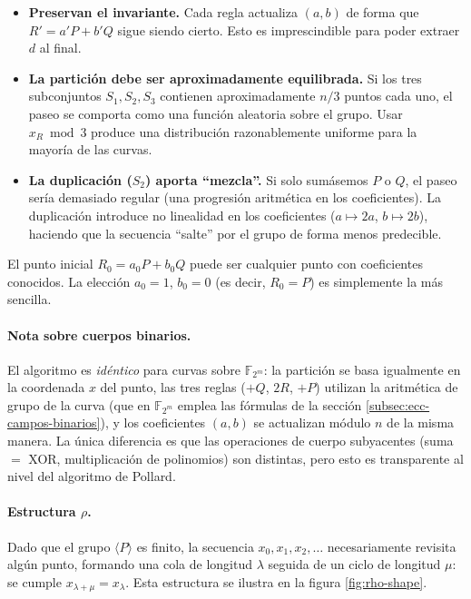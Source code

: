 \begin{itemize}
    \item \textbf{Preservan el invariante.} Cada regla actualiza $(a, b)$ de forma que $R' = a'P + b'Q$ sigue siendo cierto. Esto es imprescindible para poder extraer $d$ al final.

    \item \textbf{La partición debe ser aproximadamente equilibrada.} Si los tres subconjuntos $S_1, S_2, S_3$ contienen aproximadamente $n/3$ puntos cada uno, el paseo se comporta como una función aleatoria sobre el grupo. Usar $x_R \bmod 3$ produce una distribución razonablemente uniforme para la mayoría de las curvas.

    \item \textbf{La duplicación ($S_2$) aporta ``mezcla''.} Si solo sumásemos $P$ o $Q$, el paseo sería demasiado regular (una progresión aritmética en los coeficientes). La duplicación introduce no linealidad en los coeficientes ($a \mapsto 2a$, $b \mapsto 2b$), haciendo que la secuencia ``salte'' por el grupo de forma menos predecible.
\end{itemize}

El punto inicial $R_0 = a_0 P + b_0 Q$ puede ser cualquier punto con coeficientes conocidos. La elección $a_0 = 1$, $b_0 = 0$ (es decir, $R_0 = P$) es simplemente la más sencilla.

\paragraph{Nota sobre cuerpos binarios.}
El algoritmo es \emph{idéntico} para curvas sobre $\mathbb{F}_{2^m}$: la partición se basa igualmente en la coordenada $x$ del punto, las tres reglas ($+Q$, $2R$, $+P$) utilizan la aritmética de grupo de la curva (que en $\mathbb{F}_{2^m}$ emplea las fórmulas de la sección \ref{subsec:ecc-campos-binarios}), y los coeficientes $(a, b)$ se actualizan módulo $n$ de la misma manera. La única diferencia es que las operaciones de cuerpo subyacentes (suma $=$ XOR, multiplicación de polinomios) son distintas, pero esto es transparente al nivel del algoritmo de Pollard.


\paragraph{\texorpdfstring{Estructura $\rho$.}{Estructura rho.}}
Dado que el grupo $\langle P \rangle$ es finito, la secuencia $x_0, x_1, x_2, \ldots$ necesariamente revisita algún punto, formando una cola de longitud $\lambda$ seguida de un ciclo de longitud $\mu$: se cumple $x_{\lambda + \mu} = x_\lambda$. Esta estructura se ilustra en la figura \ref{fig:rho-shape}.

